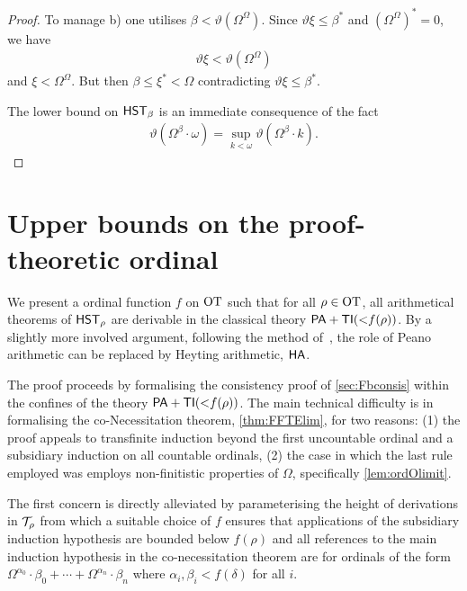 \documentclass[UKenglish,cleveref,DIV=12]{scrartcl}
\theoremstyle{definition}
\theoremstyle{definition}
\begin{document}
\begin{proof}
To manage b) one utilises $\beta<\vartheta(\Omega^\Omega)$. Since
$\vartheta\xi\le\beta^*$ and $(\Omega^\Omega)^*=0$, we have
\begin{align*}
  \vartheta\xi<\vartheta(\Omega^\Omega)
\end{align*}
and $\xi<\Omega^\Omega$. %
But then $\beta\le\xi^*<\Omega$
contradicting $\vartheta\xi\le\beta^*$.

The lower bound on $\mathsf{HST}_\beta$ is an immediate consequence of the fact
\begin{align*}
  \vartheta(\Omega^{\beta}\cdot \omega)=\sup_{k<\omega}\vartheta(\Omega^{\beta}\cdot k).
\end{align*}
\end{proof}

\section{Upper bounds on the proof-theoretic ordinal}\label{sec:Fbupper1}


We present a ordinal function \( f \) on \( \mathrm{OT} \) such that for all \( \rho \in \mathrm{OT} \), all arithmetical theorems of $\mathsf{HST}_\rho$ are derivable in the classical theory $\mathsf{PA}+\mathsf{TI}({<}f(\rho))$.
By a slightly more involved argument, following the method of~\cite{LeiRat10}, the role of Peano arithmetic can be replaced by Heyting arithmetic, \( \mathsf{HA} \). 

The proof proceeds by formalising the consistency proof of \cref{sec:Fbconsis} within the confines of the theory $\mathsf{PA}+\mathsf{TI}({<}f(\rho))$. 
The main technical difficulty is in formalising the co-Necessitation theorem, \cref{thm:FFTElim}, for two reasons:
(1) the proof appeals to transfinite induction beyond the first uncountable ordinal and a subsidiary induction on all countable ordinals,
(2) the case in which the last rule employed was \Uni\eta{} employs non-finitistic properties of $\Omega$, specifically \cref{lem:ordOlimit}.

The first concern is directly alleviated by parameterising the height of derivations in $\mathcal{T}_\rho$ from which a suitable choice of \( f \) ensures that applications of the subsidiary induction hypothesis are bounded below \( f(\rho) \) and all references to the main induction hypothesis in the co-necessitation theorem are for ordinals of the form
$\Omega^{\alpha_0}\cdot\beta_0+\cdots+\Omega^{
\alpha_n}\cdot\beta_n$ where $\alpha_i,\beta_i< f(\delta)$ for all $i$.
\end{document}
